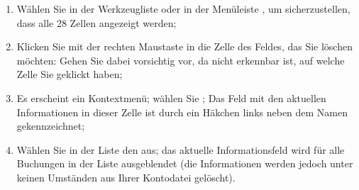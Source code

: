 \begin{enumerate}
	\item Wählen Sie in der Werkzeugliste  oder in der Menüleiste , um sicherzustellen, dass alle 28 Zellen angezeigt werden;
	\item Klicken Sie mit der rechten Maustaste in die Zelle des Feldes, das Sie löschen möchten: Gehen Sie dabei vorsichtig vor, da nicht erkennbar ist, auf welche Zelle Sie geklickt haben;
	\item Es erscheint ein Kontextmenü; wählen Sie ; Das Feld mit den aktuellen Informationen in dieser Zelle ist durch ein Häkchen links neben dem Namen gekennzeichnet;
	\item Wählen Sie in der Liste den  aus; das aktuelle Informationsfeld wird für alle Buchungen in der Liste ausgeblendet (die Informationen werden jedoch unter keinen Umständen aus Ihrer Kontodatei gelöscht).
\end{enumerate}


